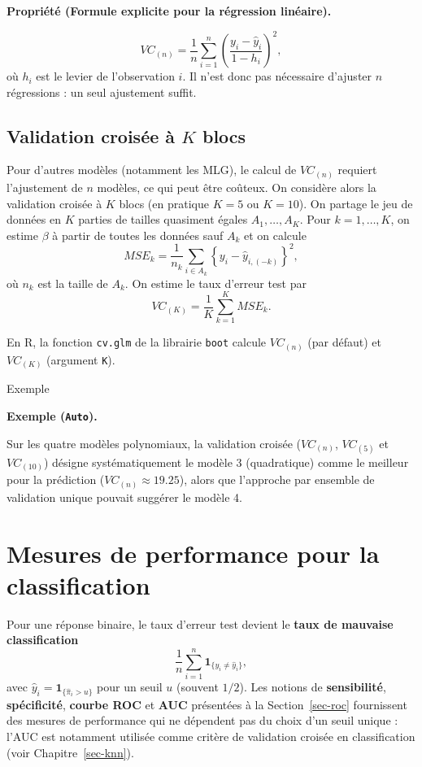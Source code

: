 \documentclass[
  french,
  letterpaper,
  DIV=11,
  numbers=noendperiod]{scrreprt}
\begin{document}
\textbf{Propriété (Formule explicite pour la régression linéaire).}

\[VC_{(n)} = \frac{1}{n}\sum_{i=1}^n\left(\frac{y_i - \hat y_i}{1 - h_i}\right)^2,\]
où \(h_i\) est le levier de l'observation \(i\). Il n'est donc pas
nécessaire d'ajuster \(n\) régressions : un seul ajustement suffit.

\subsection{\texorpdfstring{Validation croisée à \(K\)
blocs}{Validation croisée à K blocs}}\label{validation-croisuxe9e-uxe0-k-blocs}

Pour d'autres modèles (notamment les MLG), le calcul de \(VC_{(n)}\)
requiert l'ajustement de \(n\) modèles, ce qui peut être coûteux. On
considère alors la validation croisée à \(K\) blocs (en pratique
\(K = 5\) ou \(K = 10\)). On partage le jeu de données en \(K\) parties
de tailles quasiment égales \(A_1,\ldots,A_K\). Pour \(k = 1,\ldots,K\),
on estime \(\beta\) à partir de toutes les données sauf \(A_k\) et on
calcule
\[MSE_k = \frac{1}{n_k}\sum_{i\in A_k}\left\{y_i - \hat y_{i,(-k)}\right\}^2,\]
où \(n_k\) est la taille de \(A_k\). On estime le taux d'erreur test par
\[VC_{(K)} = \frac{1}{K}\sum_{k=1}^K MSE_k.\]

En R, la fonction \texttt{cv.glm} de la librairie \texttt{boot} calcule
\(VC_{(n)}\) (par défaut) et \(VC_{(K)}\) (argument \texttt{K}).

{Exemple}

\textbf{Exemple (\texttt{Auto}).}

Sur les quatre modèles polynomiaux, la validation croisée (\(VC_{(n)}\),
\(VC_{(5)}\) et \(VC_{(10)}\)) désigne systématiquement le modèle 3
(quadratique) comme le meilleur pour la prédiction
(\(VC_{(n)} \approx 19.25\)), alors que l'approche par ensemble de
validation unique pouvait suggérer le modèle 4.

\section{Mesures de performance pour la
classification}\label{mesures-de-performance-pour-la-classification}

Pour une réponse binaire, le taux d'erreur test devient le \textbf{taux
de mauvaise classification}
\[\frac{1}{n}\sum_{i=1}^n \mathbf{1}_{\{y_i \neq \hat y_i\}},\] avec
\(\hat y_i = \mathbf{1}_{\{\hat\pi_i > u\}}\) pour un seuil \(u\)
(souvent \(1/2\)). Les notions de \textbf{sensibilité},
\textbf{spécificité}, \textbf{courbe ROC} et \textbf{AUC} présentées à
la Section~\ref{sec-roc} fournissent des mesures de performance qui ne
dépendent pas du choix d'un seuil unique : l'AUC est notamment utilisée
comme critère de validation croisée en classification (voir
Chapitre~\ref{sec-knn}).
\end{document}
